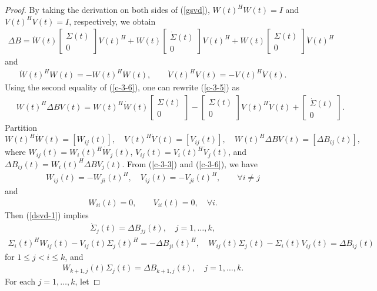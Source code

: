 \documentclass[11pt,a4paper]{article}
\numberwithin{equation}{section}
\newcommand {\mat} [1] {\left[\begin{array}{#1}}
\newcommand {\rix}     {\end{array}\right]}
\begin{document}
\medskip
\begin{proof}
By taking the derivation on both sides of (\ref{gsvd}), $W(t)^HW(t)=I$ and $V(t)^HV(t)=I$,
respectively, we obtain
\begin{eqnarray}\label{c-3-5}
\Delta B =\dot{W}(t)\mat{c}\Sigma(t)\\0\rix V(t)^H+W(t)\mat{c}\dot{\Sigma}(t)\\0\rix V(t)^H
+W(t)\mat{c}\Sigma(t)\\0\rix \dot{V}(t)^H
\end{eqnarray}
and
\begin{eqnarray}\label{c-3-6}
\dot W(t)^H W(t)=-W(t)^H\dot W(t),\qquad \dot V(t)^H V(t)=-V(t)^H\dot V(t).
\end{eqnarray}
 Using the second equality of (\ref{c-3-6}), one can rewrite (\ref{c-3-5}) as
\begin{eqnarray}\label{dsvd-1}\mbox{}\quad
W(t)^H\Delta BV(t) =W(t)^H\dot{W}(t)\mat{c}\Sigma(t)\\0\rix-\mat{c}\Sigma(t)\\0\rix V(t)^H\dot{V}(t)
+\mat{c}\dot{\Sigma}(t)\\0\rix.
\end{eqnarray}
Partition
$$
W(t)^H\dot{W}(t)=[W_{ij}(t)],\quad V(t)^H\dot{V}(t)=[V_{ij}(t)],\quad
 W(t)^H\Delta B V(t)=[\Delta B_{ij}(t)],
$$
where $W_{ij}(t)=W_i(t)^H\dot{W}_j(t)$, $V_{ij}(t)=V_i(t)^H\dot{V}_j(t)$, and
$\Delta B_{ij}(t)=W_i(t)^H\Delta BV_j(t)$.
From (\ref{c-3-3}) and (\ref{c-3-6}), we have
\begin{eqnarray}\label{skew}
W_{ij}(t)=-W_{ji}(t)^H,\quad
V_{ij}(t)=-V_{ji}(t)^H,\qquad \forall i\ne j
\end{eqnarray}
and
\begin{eqnarray}\label{skewd}
W_{ii}(t)=0,\qquad V_{ii}(t)=0,\quad \forall i.
\end{eqnarray}
Then (\ref{dsvd-1}) implies
\begin{eqnarray}\label{diag}
\dot{\Sigma}_j(t)=\Delta B_{jj}(t),\quad j=1,\ldots,k,
\end{eqnarray}
\begin{eqnarray}\label{dsvd-3}
\Sigma_i(t)^HW_{ij}(t)-V_{ij}(t)\Sigma_j(t)^H=-\Delta B_{ji}(t)^H,
\quad
W_{ij}(t)\Sigma_j(t)-\Sigma_i(t)V_{ij}(t)=\Delta B_{ij}(t)
\end{eqnarray}
for $1\le j<i\le k$, and
\begin{eqnarray}\label{w2}
W_{k+1,j}(t)\Sigma_j(t)=\Delta B_{k+1,j}(t),\quad  j=1,\ldots,k.
\end{eqnarray}
For each $j=1,\ldots,k$, let

\end{proof}
\end{document}
